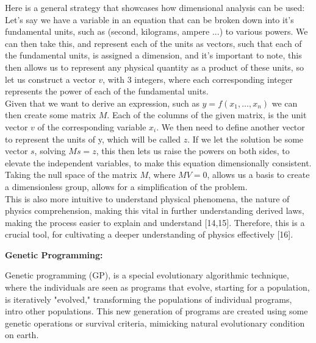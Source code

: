 \documentclass{article}
\begin{document}
Here is a general strategy that showcases how dimensional analysis can be used:\\

Let's say we have a variable in an equation that can be broken down into it's fundamental units, such as (second, kilograms, ampere ...) to various powers. We can then take this, and represent each of the units as vectors, such that each of the fundamental units, is assigned a dimension, and it's important to note, this then allows us to represent any physical quantity as a product of these units, so let us construct a vector $v$, with $3$ integers, where each corresponding integer represents the power of each of the fundamental units.\\ 

Given that we want to derive an expression, such as $y = f(x_1, \dots, x_n)$  we can then create some matrix $M$. Each of the columns of the given matrix, is the unit vector $v$ of the corresponding variable $x_i$. We then need to define another vector to represent the units of y, which will be called $z$. If we let the solution be some vector $s$, solving $Ms = z$, this then lets us raise the powers on both sides, to elevate the independent variables, to make this equation dimensionally consistent.\\ 

Taking the null space of the matrix $M$, where $MV = 0$, allows us a basis to create a dimensionless group, allows for a simplification of the problem.\\

This is also more intuitive to understand physical phenomena, the nature of physics comprehension, making this vital in further understanding derived laws, making the process easier to explain and understand [14,15]. Therefore, this is a crucial tool, for cultivating a deeper understanding of physics effectively [16]. \\






\begin{center} 
  \textbf {\Large Genetic Programming:}
\end{center}


Genetic programming (GP), is a special evolutionary algorithmic technique, where the individuals are seen as programs that evolve, starting for a population, is iteratively "evolved," transforming the populations of individual programs, intro other populations. This new generation of programs are created using some genetic operations or survival criteria, mimicking natural evolutionary condition on earth.\\ 
\end{document}
